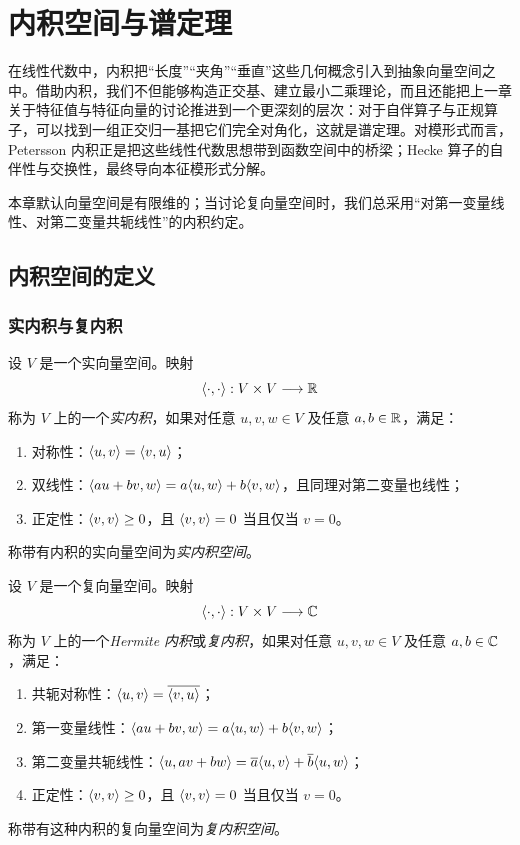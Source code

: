 \chapter{内积空间与谱定理}

在线性代数中，内积把“长度”“夹角”“垂直”这些几何概念引入到抽象向量空间之中。借助内积，我们不但能够构造正交基、建立最小二乘理论，而且还能把上一章关于特征值与特征向量的讨论推进到一个更深刻的层次：对于自伴算子与正规算子，可以找到一组正交归一基把它们完全对角化，这就是谱定理。对模形式而言，Petersson 内积正是把这些线性代数思想带到函数空间中的桥梁；Hecke 算子的自伴性与交换性，最终导向本征模形式分解。

本章默认向量空间是有限维的；当讨论复向量空间时，我们总采用“对第一变量线性、对第二变量共轭线性”的内积约定。

\section{内积空间的定义}

\subsection{实内积与复内积}

\begin{definition}
设 $V$ 是一个实向量空间。映射
\[
\langle \cdot, \cdot \rangle : V \times V \longrightarrow \mathbb{R}
\]
称为 $V$ 上的一个\emph{实内积}，如果对任意 $u,v,w\in V$ 及任意 $a,b\in\mathbb{R}$，满足：
\begin{enumerate}[label=\textnormal{(\arabic*)}]
  \item 对称性：$\langle u, v \rangle=\langle v, u \rangle$；
  \item 双线性：$\langle au+bv, w \rangle=a\langle u, w \rangle+b\langle v, w \rangle$，且同理对第二变量也线性；
  \item 正定性：$\langle v, v \rangle\ge 0$，且 $\langle v, v \rangle=0$ 当且仅当 $v=0$。
\end{enumerate}
称带有内积的实向量空间为\emph{实内积空间}。
\end{definition}

\begin{definition}
设 $V$ 是一个复向量空间。映射
\[
\langle \cdot, \cdot \rangle:V\times V\longrightarrow \mathbb{C}
\]
称为 $V$ 上的一个\emph{Hermite 内积}或\emph{复内积}，如果对任意 $u,v,w\in V$ 及任意 $a,b\in\mathbb{C}$，满足：
\begin{enumerate}[label=\textnormal{(\arabic*)}]
  \item 共轭对称性：$\langle u, v \rangle=\overline{\langle v, u \rangle}$；
  \item 第一变量线性：$\langle au+bv, w \rangle=a\langle u, w \rangle+b\langle v, w \rangle$；
  \item 第二变量共轭线性：$\langle u, av+bw \rangle=\overline{a}\langle u, v \rangle+\overline{b}\langle u, w \rangle$；
  \item 正定性：$\langle v, v \rangle\ge 0$，且 $\langle v, v \rangle=0$ 当且仅当 $v=0$。
\end{enumerate}
称带有这种内积的复向量空间为\emph{复内积空间}。
\end{definition}

